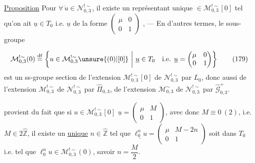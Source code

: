 \uline{Proposition} Pour $\forall\,\dot u\in\mathcal N_{0,3}^{!\sim}$, il existe un représentant unique  $\in\mathcal M_{0,3}^{!\sim}[0]$ tel qu'on ait $\underline u\in T_0$ i.e. $\underline u$ de la forme $\begin{pmatrix}\mu&0\\0&1\end{pmatrix}$
\inserted{[i.e. $\xi=\begin{pmatrix}A&B\\C&D\end{pmatrix}$ de la forme $\begin{pmatrix}A&0\\C&D\end{pmatrix}=\begin{pmatrix}\illegible{1}&0\\1-D&D\end{pmatrix}$]}, --- En d'autres termes, le sous-groupe


\[
\mathcal M_{0,3}^{!\sim}(0)\overset{\mathrm{df}}=
\left\{u\in\mathcal M_{0,3}^{!\sim}\unsure{(0)|[0]}\ \middle|\ \underline u\in T_0\quad\text{i.e. }\underline u=\begin{pmatrix}\mu&0\\0&1\end{pmatrix}\right\}
\tag{179}
\]
est un ss-groupe section de l'extension $\mathcal M_{0,3}^{!\sim}[0]$ de $\mathcal N_{0,3}^{!\sim}$ par $L_0$, donc aussi de l'extension $\mathcal M_{0,3}^{!\sim}$ de $\mathcal N_{0,3}^{!\sim}$ par $\widehat\Pi_{0,3}$,  de l'extension $\mathcal M_{0,3}^{\sim}$ de $\mathcal N_{0,3}^{!\sim}$ par $\widehat{\mathcal G}_{0,3}^{+}$.

 provient du fait que si $u\in\mathcal M_{0,3}^{!\sim}[0]$  $\underline u=\begin{pmatrix}\mu&M\\0&1\end{pmatrix}$, avec donc $M\equiv0\ (2)$, i.e. $M\in2\widehat{\mathbb Z}$, il existe un \uline{unique} $n\in\widehat{\mathbb Z}$ tel que $\underline{\ell_0^n u}=\begin{pmatrix}\mu&M-2n\\0&1\end{pmatrix}$ soit dans $T_0$ i.e. tel que $\ell_0^n u\in\mathcal M_{0,3}^{!\sim}(0)$, savoir $n=\dfrac M2$.

